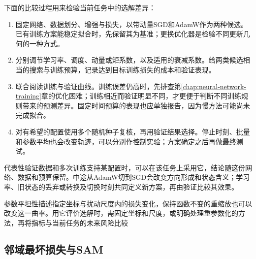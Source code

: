 下面的比较过程用来检验当前任务中的选解差异：
\begin{enumerate}
  \item 固定网络、数据划分、增强与损失，以带动量SGD和AdamW作为两种候选。已有训练方案能稳定拟合时，先保留其为基准；更换优化器是检验不同更新几何的一种方式。
  \item 分别调节学习率、调度、动量或矩系数，以及适用的衰减系数。给两类候选相当的搜索与训练预算，记录达到目标训练损失的成本和验证表现。
  \item 联合阅读训练与验证曲线。训练误差仍高时，先排查第\ref{chap:neural-network-training}章的优化困难；训练相近而验证明显不同，才更便于判断不同训练规则带来的预测差异。固定时间预算的表现也应单独报告，因为慢方法可能尚未完成拟合。
  \item 对有希望的配置使用多个随机种子复核，再用验证结果选择。停止时刻、批量和参数平均也会改变轨迹，可以分别作控制实验；方案确定之后再做最终测试。
\end{enumerate}

代表性验证数据和多次训练支持某配置时，可以在该任务上采用它，结论随这份网络、数据和预算保留。中途从AdamW切到SGD会改变方向形成和状态含义；学习率、旧状态的丢弃或转换及切换时刻共同定义新方案，再由验证比较其效果。

参数平坦性描述指定坐标与扰动尺度内的损失变化，保持函数不变的重缩放也可以改变这一曲率。用它评价选解时，需固定坐标和尺度，或明确处理重参数化的方法，再将指标与当前任务的未来风险比较

\subsection{邻域最坏损失与SAM}
\label{sec:generalization-sam}

